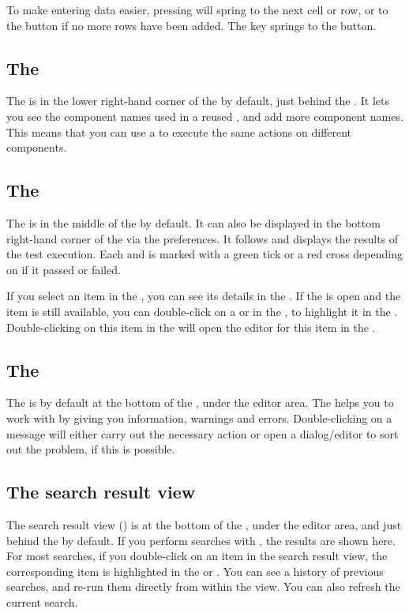 To make entering data easier, pressing  will spring to the next cell or row, or to the  button if no more rows have been added. The  key  springs to the  button. 

\subsection{The \gdcompnamesview{}}
The \gdcompnamesview{} is in the lower right-hand corner of the \specpersp{}  by default, just behind the \gddatasetsview{}. It lets you see the component names used in a reused \gdcase{}, and add more component names. This means that you can use a \gdcase{} to execute the same actions on different components. 

\subsection{The \gdtestresultview{}} 

The \gdtestresultview{} is in the middle of the \execpersp{}  by default. It can also be displayed in the bottom right-hand corner of the \specpersp{} via the preferences. It follows and displays the results of the test execution. Each \gdstep{} and \gdcase{} is marked with a green tick or a red cross depending on if it passed or failed. 

If you select an item in the \gdtestresultview{}, you can see its details in the \gdpropview{}. If the \gdproject{} is open and the item is still available, you can double-click on a \gdstep{} or \gdcase{} in the \gdtestresultview{}, to highlight it in the \gdtestsuitebrowser{}. Double-clicking on this item in the \gdtestsuitebrowser{} will open the editor for this item in the \specpersp{}. 

\subsection{The \gdprobview{}}
The \gdprobview{} is by default at the bottom of the \specpersp{}, under the editor area. The \gdpropview{} helps you to work with \app{} by giving you information, warnings and errors. Double-clicking on a message will either carry out the necessary action or open a dialog/editor to sort out the problem, if this is possible. 

\subsection{The search result view}
The search result view () is at the bottom of the \specpersp{}, under the editor area, and just behind the \gdprobview{} by default. If you perform searches with \app{}, the results are shown here. For most searches, if you double-click on an item in the search result view, the corresponding item is highlighted in the \gdtestcasebrowser{} or \gdtestsuitebrowser{}. You can see a history of previous searches, and re-run them directly from within the view. You can also refresh the current search. 

